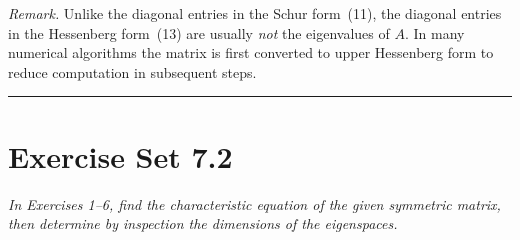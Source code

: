 \documentclass{article}
\theoremstyle{mystyle}
\begin{document}
\textit{Remark.} Unlike the diagonal entries in the Schur form~(11), the diagonal entries
in the Hessenberg form~(13) are usually \emph{not} the eigenvalues of $A$. In many
numerical algorithms the matrix is first converted to upper Hessenberg form to reduce
computation in subsequent steps.

\vspace{3mm}
\noindent\rule{\linewidth}{0.5pt}

\section*{Exercise Set 7.2}

\noindent\textit{In Exercises 1--6, find the characteristic equation of the given
symmetric matrix, then determine by inspection the dimensions of the eigenspaces.}
\end{document}
